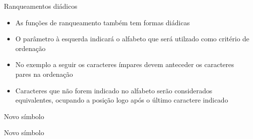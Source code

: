 \begin{frame}[fragile]{Ranqueamentos diádicos}

    \begin{itemize}
        \item As funções de ranqueamento também tem formas diádicas

        \item O parâmetro à esquerda indicará o alfabeto  que será utilzado como
            critério de ordenação

        \item No exemplo a seguir os caracteres ímpares devem anteceder os caracteres pares na
            ordenação

        \item Caracteres que não forem indicado no alfabeto serão considerados equivalentes, 
            ocupando a posição logo após o último caractere indicado
    \end{itemize}

\end{frame}
\begin{frame}[fragile]{Novo símbolo}


\end{frame}

\begin{frame}[fragile]{Novo símbolo}


\end{frame}
